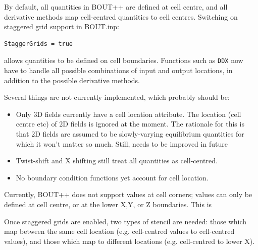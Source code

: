 \documentclass[12pt]{article}
\newcommand{\code}[1]{\texttt{#1}}
\begin{document}
By default, all quantities in BOUT++ are defined at cell centre, and
all derivative methods map cell-centred quantities to cell centres.
Switching on staggered grid support in BOUT.inp:
\begin{verbatim}
StaggerGrids = true
\end{verbatim}
allows quantities to be defined on cell boundaries. Functions such as \code{DDX} now have to handle
all possible combinations of input and output locations, in addition to the possible
derivative methods. 

Several things are not currently implemented, which probably should be:
\begin{itemize}
\item Only 3D fields currently have a cell location attribute. The location (cell centre etc) of 2D fields is ignored at the moment. The rationale for this is that 2D fields are assumed to be slowly-varying equilibrium quantities for which it won't matter so much. Still, needs to be improved in future
\item Twist-shift and X shifting still treat all quantities as cell-centred.
\item No boundary condition functions yet account for cell location. 
\end{itemize}

Currently, BOUT++ does not support values at cell corners; values can
only be defined at cell centre, or at the lower X,Y, or Z boundaries. 
This is 

Once staggered grids are enabled, two types of stencil are needed: those
which map between the same cell location (e.g. cell-centred values to cell-centred values), and those which map to different locations (e.g. cell-centred to lower X).
\end{document}
